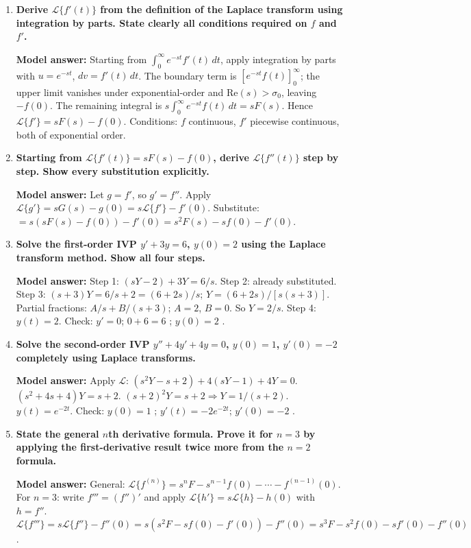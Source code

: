 \documentclass[12pt,a4paper]{article}
\begin{document}
\begin{enumerate}

\item \textbf{Derive $\mathcal{L}\{f'(t)\}$ from the definition of the
Laplace transform using integration by parts. State clearly all
conditions required on $f$ and $f'$.}

\textbf{Model answer:} Starting from $\int_0^\infty e^{-st}f'(t)\,dt$,
apply integration by parts with $u=e^{-st}$, $dv=f'(t)\,dt$. The
boundary term is $[e^{-st}f(t)]_0^\infty$; the upper limit vanishes
under exponential-order and $\text{Re}(s)>\sigma_0$, leaving $-f(0)$.
The remaining integral is $s\int_0^\infty e^{-st}f(t)\,dt = sF(s)$.
Hence $\mathcal{L}\{f'\} = sF(s)-f(0)$. Conditions: $f$ continuous,
$f'$ piecewise continuous, both of exponential order.

\item \textbf{Starting from $\mathcal{L}\{f'(t)\} = sF(s)-f(0)$, derive
$\mathcal{L}\{f''(t)\}$ step by step. Show every substitution
explicitly.}

\textbf{Model answer:} Let $g = f'$, so $g' = f''$. Apply
$\mathcal{L}\{g'\} = sG(s)-g(0) = s\mathcal{L}\{f'\}-f'(0)$.
Substitute: $= s(sF(s)-f(0))-f'(0) = s^2F(s)-sf(0)-f'(0)$.

\item \textbf{Solve the first-order IVP $y' + 3y = 6$, $y(0) = 2$ using
the Laplace transform method. Show all four steps.}

\textbf{Model answer:} Step 1: $(sY-2)+3Y=6/s$. Step 2: already
substituted. Step 3: $(s+3)Y = 6/s+2 = (6+2s)/s$; $Y=(6+2s)/[s(s+3)]$.
Partial fractions: $A/s + B/(s+3)$; $A=2$, $B=0$. So $Y=2/s$.
Step 4: $y(t)=2$. Check: $y'=0$; $0+6=6$ \checkmark; $y(0)=2$
\checkmark.

\item \textbf{Solve the second-order IVP $y'' + 4y' + 4y = 0$, $y(0)=1$,
$y'(0)=-2$ completely using Laplace transforms.}

\textbf{Model answer:} Apply $\mathcal{L}$:
$(s^2Y-s+2) + 4(sY-1) + 4Y = 0$.
$(s^2+4s+4)Y = s+2$.
$(s+2)^2 Y = s+2 \Rightarrow Y = 1/(s+2)$.
$y(t) = e^{-2t}$.
Check: $y(0)=1$ \checkmark; $y'(t)=-2e^{-2t}$; $y'(0)=-2$ \checkmark.

\item \textbf{State the general $n$th derivative formula. Prove it for
$n=3$ by applying the first-derivative result twice more from the
$n=2$ formula.}

\textbf{Model answer:} General: $\mathcal{L}\{f^{(n)}\} = s^n F -
s^{n-1}f(0)-\cdots-f^{(n-1)}(0)$. For $n=3$: write $f'''=(f'')'$ and
apply $\mathcal{L}\{h'\}=s\mathcal{L}\{h\}-h(0)$ with $h=f''$.
$\mathcal{L}\{f'''\}= s\mathcal{L}\{f''\}-f''(0) =
s(s^2F-sf(0)-f'(0))-f''(0) = s^3F-s^2f(0)-sf'(0)-f''(0)$.

\end{enumerate}
\end{document}
